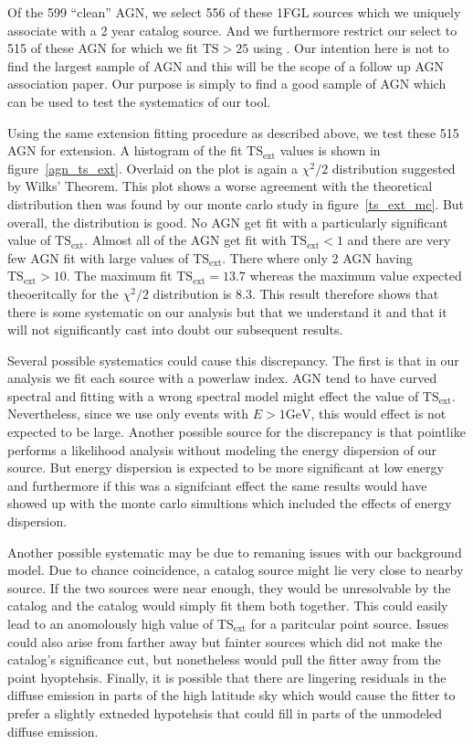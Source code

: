 \documentclass[preprint]{aastex}
\newcommand{\gev}{\text{GeV}\xspace}
\newcommand{\tsext}{{\ensuremath{\text{TS}_\text{ext}}}\xspace}
\newcommand{\ts}{\text{TS}\xspace}
\newcommand{\pointlike}{\text{\em pointlike}\xspace}
\begin{document}
Of the 599 ``clean'' AGN, we select 556 of these 1FGL sources which
we uniquely associate with a 2 year catalog source. And we furthermore
restrict our select to 515 of these AGN for which we fit $\ts>25$ using
\pointlike.  Our intention here is not to find the largest sample of
AGN and this will be the scope of a follow up AGN association paper. Our
purpose is simply to find a good sample of AGN which can be used to
test the systematics of our tool.

Using the same extension fitting procedure as described above, we
test these 515 AGN for extension. A histogram of the fit \tsext values
is shown in figure~\ref{agn_ts_ext}. Overlaid on the plot is again a
$\chi^2/2$ distribution suggested by Wilks' Theorem.  This plot shows
a worse agreement with the theoretical distribution then was found
by our monte carlo study in figure~\ref{ts_ext_mc}.  But overall, the
distribution is good. No AGN get fit with a particularly significant
value of $\tsext$. Almost all of the AGN get fit with $\tsext<1$ and
there are very few AGN fit with large values of \tsext.  There where
only 2 AGN having $\tsext>10$.  The maximum fit $\tsext=13.7$ whereas the
maximum value expected theoeritcally for the $\chi^2/2$ distribution is
8.3. This result therefore shows that there is some systematic on our
analysis but that we understand it and that it will not significantly
cast into doubt our subsequent results.

Several possible systematics could cause this discrepancy. The first
is that in our analysis we fit each source with a powerlaw index.
AGN tend to have curved spectral and fitting with a wrong spectral
model might effect the value of \tsext. Nevertheless, since we use only
events with $E>1\gev$, this would effect is not expected to be large.
Another possible source for the discrepancy is that pointlike performs a
likelihood analysis without modeling the energy dispersion of our source.
But energy dispersion is expected to be more significant at low
energy and furthermore if this was a signifciant effect the same results
would have showed up with the monte carlo simultions which included the
effects of energy dispersion. 

Another possible systematic may be due to remaning issues with our
background model. Due to chance coincidence, a catalog source might
lie very close to nearby source. If the two sources were near enough,
they would be unresolvable by the catalog and the catalog would simply
fit them both together.  This could easily lead to an anomolously high
value of \tsext for a paritcular point source. Issues could also arise
from farther away but fainter sources which did not make the catalog's
significance cut, but nonetheless would pull the fitter away from the
point hyoptehsis.  Finally, it is possible that there are lingering
residuals in the diffuse emission in parts of the high latitude sky
which would cause the fitter to prefer a slightly extneded hypotehsis
that could fill in parts of the unmodeled diffuse emission.
\end{document}
